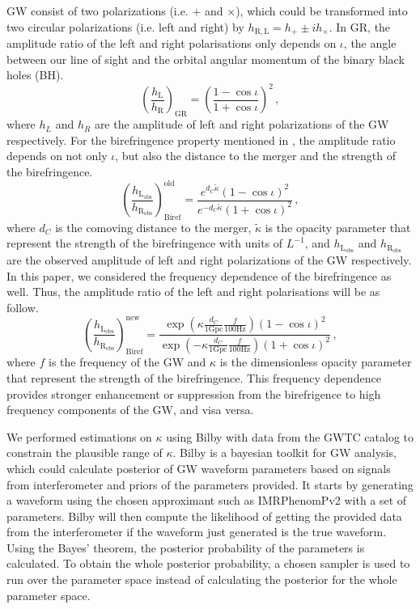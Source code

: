 \documentclass[twocolumn]{aastex631}
\begin{document}
GW consist of two polarizations (i.e. $+$ and $\times$), which could be transformed into two circular polarizations (i.e. left and right) by $h_{\mathrm{R}, \mathrm{L}} = h_+ \pm i h_\times$.
In GR, the amplitude ratio of the left and right polarisations only depends on $\iota$, the angle between our line of sight and the orbital angular momentum of the binary black holes (BH).
\begin{equation}
    \left(\frac{h_\mathrm{L}}{h_\mathrm{R}}\right)_\mathrm{GR}=\left(\frac{1-\cos\iota}{1+\cos\iota}\right)^2\,,
\end{equation}where $h_L$ and $h_R$ are the amplitude of left and right polarizations of the GW respectively.
For the birefringence property mentioned in \citet{Maria_2021}, the amplitude ratio depends on not only $\iota$, but also the distance to the merger and the strength of the birefringence.
\begin{equation}
    \left(\frac{h_\mathrm{L_{obs}}}{h_\mathrm{R_{obs}}}\right)_\mathrm{Biref}^\mathrm{old}=\frac{e^{d_C\widetilde{\kappa}}\left(1-\cos\iota\right)^2}{e^{-d_C\widetilde{\kappa}}\left(1+\cos\iota\right)^2}\,,
\end{equation}where $d_C$ is the comoving distance to the merger, $\widetilde{\kappa}$ is the opacity parameter that represent the strength of the birefringence with units of $L^{-1}$, and $h_\mathrm{L_{obs}}$ and $h_\mathrm{R_{obs}}$ are the observed amplitude of left and right polarizations of the GW respectively.
In this paper, we considered the frequency dependence of the birefringence as well. Thus, the amplitude ratio of the left and right polarisations will be as follow.
\begin{equation}
    \left(\frac{h_\mathrm{L_{obs}}}{h_\mathrm{R_{obs}}}\right)_\mathrm{Biref}^\mathrm{new}=\frac{\exp\left({\kappa\frac{d_C}{1\mathrm{ Gpc}}\frac{f}{100\mathrm{ Hz}}}\right)\left(1-\cos\iota\right)^2}{\exp\left({-\kappa\frac{d_C}{1\mathrm{Gpc}}\frac{f}{100\mathrm{Hz}}}\right)\left(1+\cos\iota\right)^2}\,,
\end{equation}where $f$ is the frequency of the GW and $\kappa$ is the dimensionless opacity parameter that represent the strength of the birefringence.
This frequency dependence provides stronger enhancement or suppression from the birefrigence to high frequency components of the GW, and visa versa.

We performed estimations on $\kappa$ using Bilby with data from the GWTC catalog to constrain the plausible range of $\kappa$.
Bilby is a bayesian toolkit for GW analysis, which could calculate posterior of GW waveform parameters based on signals from interferometer and priors of the parameters provided. \citep{Ashton_2019}
It starts by generating a waveform using the chosen approximant such as IMRPhenomPv2 with a set of parameters.
Bilby will then compute the likelihood of getting the provided data from the interferometer if the waveform just generated is the true waveform.
Using the Bayes' theorem, the posterior probability of the parameters is calculated.
To obtain the whole posterior probability, a chosen sampler is used to run over the parameter space instead of calculating the posterior for the whole parameter space.
\end{document}
